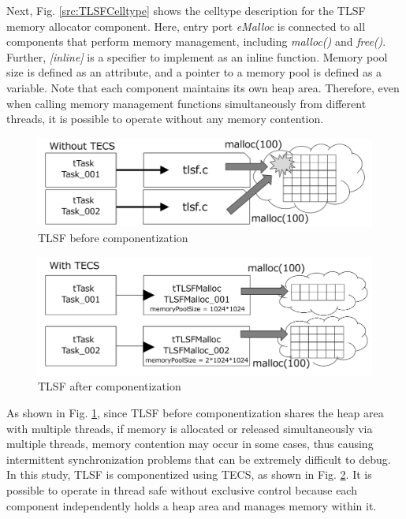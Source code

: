 \documentclass[a4j,12pt,oneside,openany,english]{jsbook}
\begin{document}
Next, Fig. \ref{src:TLSFCelltype} shows the celltype description for the TLSF memory allocator component.
Here, entry port {\it eMalloc} is connected to all components that perform memory management, including {\it malloc()} and {\it free()}.
Further, {\it [inline]} is a specifier to implement as an inline function.
Memory pool size is defined as an attribute, and a pointer to a memory pool is defined as a variable.
Note that each component maintains its own heap area.
Therefore, even when calling memory management functions simultaneously from different threads, it is possible to operate without any memory contention.

\begin{figure}[t]
    \centering
    \includegraphics[width=12cm,clip]{figure/WithoutTECS.pdf}
    \caption{TLSF before componentization}
    \label{fig:WithoutTECS}
\end{figure}

\begin{figure}[t]
    \centering
    \includegraphics[width=12cm,clip]{figure/WithTECS.pdf}
    \caption{TLSF after componentization}
    \label{fig:WithTECS}
\end{figure}

As shown in Fig. \ref{fig:WithoutTECS}, since TLSF before componentization shares the heap area with multiple threads, if memory is allocated or released simultaneously via multiple threads, memory contention may occur in some cases, thus causing intermittent synchronization problems that can be extremely difficult to debug.
In this study, TLSF is componentized using TECS, as shown in Fig. \ref{fig:WithTECS}.
It is possible to operate in thread safe without exclusive control because each component independently holds a heap area and manages memory within it. 
\end{document}
